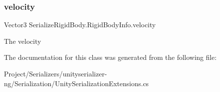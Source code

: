 \subsubsection{\texorpdfstring{velocity}{velocity}}
{\footnotesize\ttfamily Vector3 Serialize\+Rigid\+Body.\+Rigid\+Body\+Info.\+velocity}



The velocity 



The documentation for this class was generated from the following file\+:\begin{DoxyCompactItemize}
\item 
Project/\+Serializers/unityserializer-\/ng/\+Serialization/Unity\+Serialization\+Extensions.\+cs\end{DoxyCompactItemize}
